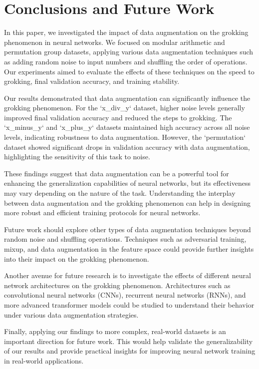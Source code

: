 \documentclass{article} %
\begin{document}
\section{Conclusions and Future Work}
\label{sec:conclusion}

In this paper, we investigated the impact of data augmentation on the grokking phenomenon in neural networks. We focused on modular arithmetic and permutation group datasets, applying various data augmentation techniques such as adding random noise to input numbers and shuffling the order of operations. Our experiments aimed to evaluate the effects of these techniques on the speed to grokking, final validation accuracy, and training stability.

Our results demonstrated that data augmentation can significantly influence the grokking phenomenon. For the `x\_div\_y` dataset, higher noise levels generally improved final validation accuracy and reduced the steps to grokking. The `x\_minus\_y` and `x\_plus\_y` datasets maintained high accuracy across all noise levels, indicating robustness to data augmentation. However, the `permutation` dataset showed significant drops in validation accuracy with data augmentation, highlighting the sensitivity of this task to noise.

These findings suggest that data augmentation can be a powerful tool for enhancing the generalization capabilities of neural networks, but its effectiveness may vary depending on the nature of the task. Understanding the interplay between data augmentation and the grokking phenomenon can help in designing more robust and efficient training protocols for neural networks.

Future work should explore other types of data augmentation techniques beyond random noise and shuffling operations. Techniques such as adversarial training, mixup, and data augmentation in the feature space could provide further insights into their impact on the grokking phenomenon.

Another avenue for future research is to investigate the effects of different neural network architectures on the grokking phenomenon. Architectures such as convolutional neural networks (CNNs), recurrent neural networks (RNNs), and more advanced transformer models could be studied to understand their behavior under various data augmentation strategies.

Finally, applying our findings to more complex, real-world datasets is an important direction for future work. This would help validate the generalizability of our results and provide practical insights for improving neural network training in real-world applications.






\end{document}
